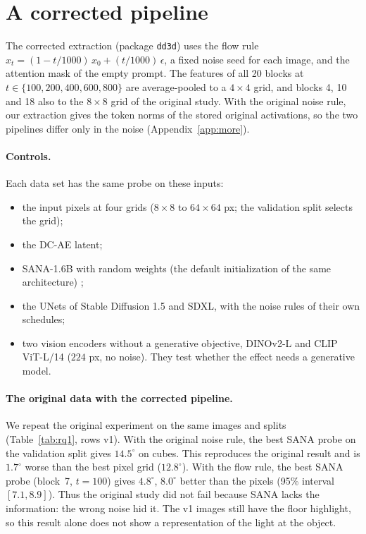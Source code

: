 \documentclass[10pt]{article}
\newcommand{\degr}{^\circ}
\begin{document}
\begin{table}[t]
\centering
\caption{Pixel probes on image regions (test split: spheres and cylinders; cubes: \texttt{test\_cubes}). Global: the dataset label (lamp position). Local: the light direction at the object.}
\label{tab:cues}

\end{table}

\section{A corrected pipeline}
\label{sec:pipeline}

The corrected extraction (package \texttt{dd3d}) uses the flow rule $x_t=(1-t/1000)\,x_0+(t/1000)\,\epsilon$, a fixed noise seed for each image, and the attention mask of the empty prompt.
The features of all 20 blocks at $t\in\{100,200,400,600,800\}$ are average-pooled to a $4\times4$ grid, and blocks 4, 10 and 18 also to the $8\times8$ grid of the original study.
With the original noise rule, our extraction gives the token norms of the stored original activations, so the two pipelines differ only in the noise (Appendix~\ref{app:more}).

\paragraph{Controls.}
Each data set has the same probe on these inputs:
\begin{itemize}
    \item the input pixels at four grids ($8\times8$ to $64\times64$ px; the validation split selects the grid);
    \item the DC-AE latent;
    \item SANA-1.6B with random weights (the default initialization of the same architecture) \citep{adebayo2018sanity};
    \item the UNets of Stable Diffusion 1.5 and SDXL, with the noise rules of their own schedules;
    \item two vision encoders without a generative objective, DINOv2-L \citep{oquab2024dinov2} and CLIP ViT-L/14 \citep{radford2021clip} ($224$ px, no noise). They test whether the effect needs a generative model.
\end{itemize}

\paragraph{The original data with the corrected pipeline.}
We repeat the original experiment on the same images and splits (Table~\ref{tab:rq1}, rows v1).
With the original noise rule, the best SANA probe on the validation split gives $14.5\degr$ on cubes. This reproduces the original result and is $1.7\degr$ worse than the best pixel grid ($12.8\degr$).
With the flow rule, the best SANA probe (block~7, $t=100$) gives $4.8\degr$, $8.0\degr$ better than the pixels (95\% interval $[7.1, 8.9]$).
Thus the original study did not fail because SANA lacks the information: the wrong noise hid it.
The v1 images still have the floor highlight, so this result alone does not show a representation of the light at the object.
\end{document}
